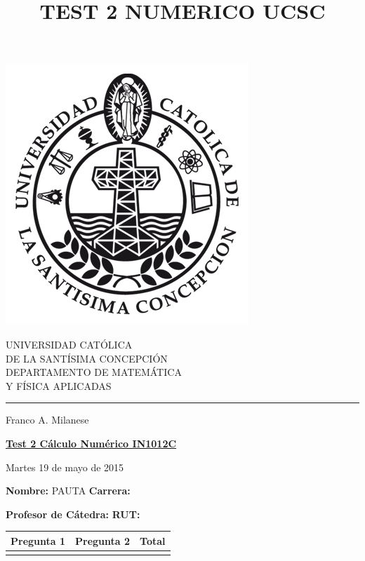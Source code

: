 \documentclass[11pt]{article}
\begin{document}
\title{TEST 2 NUMERICO UCSC}

\begin{minipage}{0.15\textwidth}
\includegraphics[width=\textwidth]{ucsc.png}
\end{minipage}
\begin{minipage}{0.9\textwidth}
{UNIVERSIDAD CAT\'OLICA}\\ 
{DE LA SANT\'ISIMA CONCEPCI\'ON}\\
{DEPARTAMENTO DE MATEM\'ATICA}\\ 
{ Y F\'ISICA APLICADAS}\\
\rule{0.66\textwidth}{.5pt} Franco A. Milanese
\end{minipage}

\vspace*{0.5cm} \centerline {\bf\underline{Test 2 C\'alculo Num\'erico IN1012C }}
\centerline{\textrm{Martes 19 de mayo de 2015}}  

\vspace{0.2cm}
\textbf{Nombre:} PAUTA \hspace{0.65\textwidth}\textbf{Carrera:}

\vspace{0.1cm}
\textbf{Profesor de C\'atedra:}\hspace{0.5\textwidth} \textbf{ RUT:}
 \begin{center}
 \begin{tabular}{||p{2cm}|p{2cm}|p{2cm}||}
 \hline
 Pregunta 1 &  Pregunta 2 &     Total\\
 \hline

  \vspace{1.5cm} & &       \\
 \hline
 \end{tabular}
 \end{center}
\end{document}
